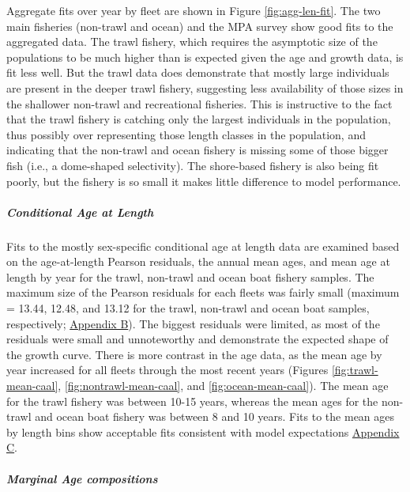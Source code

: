 \documentclass[11pt,
  english,
  letterpaper,
]{article}
\begin{document}
Aggregate fits over year by fleet are shown in Figure \ref{fig:agg-len-fit}. The two main fisheries (non-trawl and ocean) and the MPA survey show good fits to the aggregated data. The trawl fishery, which requires the asymptotic size of the populations to be much higher than is expected given the age and growth data, is fit less well. But the trawl data does demonstrate that mostly large individuals are present in the deeper trawl fishery, suggesting less availability of those sizes in the shallower non-trawl and recreational fisheries. This is instructive to the fact that the trawl fishery is catching only the largest individuals in the population, thus possibly over representing those length classes in the population, and indicating that the non-trawl and ocean fishery is missing some of those bigger fish (i.e., a dome-shaped selectivity). The shore-based fishery is also being fit poorly, but the fishery is so small it makes little difference to model performance.

\hypertarget{conditional-age-at-length}{%
\subparagraph{Conditional Age at Length}\label{conditional-age-at-length}}

Fits to the mostly sex-specific conditional age at length data are examined based on the age-at-length Pearson residuals, the annual mean ages, and mean age at length by year for the trawl, non-trawl and ocean boat fishery samples. The maximum size of the Pearson residuals for each fleets was fairly small (maximum = 13.44, 12.48, and 13.12 for the trawl, non-trawl and ocean boat samples, respectively; \protect\hyperlink{app_b}{Appendix B}). The biggest residuals were limited, as most of the residuals were small and unnoteworthy and demonstrate the expected shape of the growth curve. There is more contrast in the age data, as the mean age by year increased for all fleets through the most recent years (Figures \ref{fig:trawl-mean-caal}, \ref{fig:nontrawl-mean-caal}, and \ref{fig:ocean-mean-caal}). The mean age for the trawl fishery was between 10-15 years, whereas the mean ages for the non-trawl and ocean boat fishery was between 8 and 10 years. Fits to the mean ages by length bins show acceptable fits consistent with model expectations \protect\hyperlink{app_c}{Appendix C}.

\hypertarget{marginal-age-compositions}{%
\subparagraph{Marginal Age compositions}\label{marginal-age-compositions}}
\end{document}
